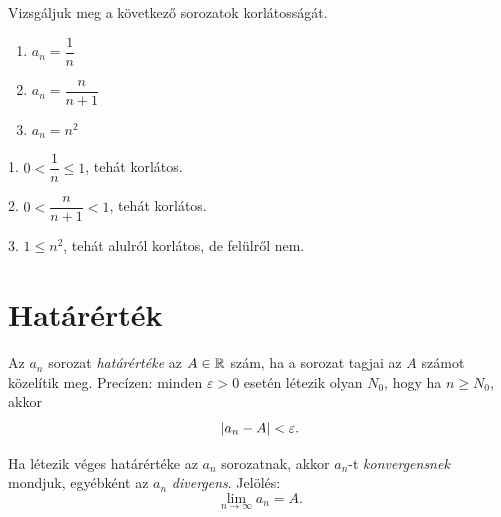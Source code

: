 \documentclass[11pt]{article}
\begin{document}
\begin{exbox}
\begin{example}
Vizsgáljuk meg a következő sorozatok korlátosságát.
\begin{enumerate}[label=\arabic*., itemsep=6pt]
\item $a_{n}=\dfrac{1}{n}$
\item $a_{n}=\dfrac{n}{n+1}$
\item $a_{n}=n^{2}$
\end{enumerate}
\end{example}
\end{exbox}
\begin{solution}
1. $0<\dfrac{1}{n}\le 1$, tehát korlátos.

2. $0<\dfrac{n}{n+1}<1$, tehát korlátos.

3. $1\le n^{2}$, tehát alulról korlátos, de felülről nem.
\end{solution}

\section{Határérték}

\begin{defbox}
\begin{definition}[Határérték]
Az $a_{n}$ sorozat \emph{határértéke} az $A\in\mathbb{R}$ szám, ha a sorozat tagjai az $A$ számot közelítik meg. Precízen: minden $\varepsilon>0$ esetén létezik olyan $N_{0}$, hogy ha $n\ge N_{0}$, akkor
\[
\left|a_{n}-A\right|<\varepsilon .
\]
\end{definition}
\end{defbox}

\begin{defbox}
\begin{definition}
Ha létezik véges határértéke az $a_{n}$ sorozatnak, akkor $a_{n}$-t \emph{konvergensnek} mondjuk, egyébként az $a_{n}$ \emph{divergens}. Jelölés:
\[
\lim_{n\to\infty}a_{n}=A .
\]
\end{definition}
\end{defbox}
\end{document}
